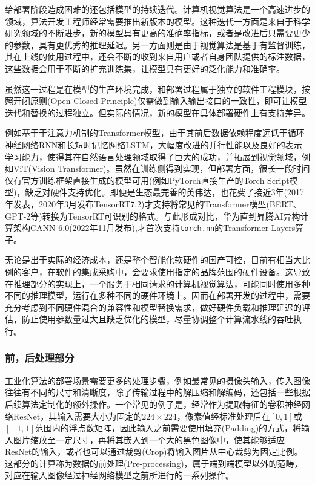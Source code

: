 \documentclass[master]{shtthesis}
\begin{document}
给部署阶段造成困难的还包括模型的持续迭代。计算机视觉算法是一个高速进步的领域，算法开发工程师经常需要推出新版本的模型。这种迭代一方面是来自于科学研究领域的不断进步，新的模型具有更高的准确率指标，或者是改进后只需要更少的参数，具有更优秀的推理延迟。另一方面则是由于视觉算法是基于有监督训练，其在上线的使用过程中，还会不断的收到来自用户或者自身团队提供的标注数据，这些数据会用于不断的扩充训练集，让模型具有更好的泛化能力和准确率。

虽然这一过程是在模型的生产环境完成，和部署过程属于独立的软件工程模块，按照开闭原则(Open-Closed Principle)仅需做到输入输出接口的一致性，即可让模型迭代和替换的过程独立。但实际的情况，新的模型在具体部署硬件上有支持差异。

例如基于于注意力机制的Transformer\cite{vaswani2017attention}模型，由于其前后数据依赖程度远低于循环神经网络RNN和长短时记忆网络LSTM，大幅度改进的并行性能以及良好的表示学习能力，使得其在自然语言处理领域取得了巨大的成功，并拓展到视觉领域，例如ViT(Vision Transformer)\cite{khan2022transformers}。虽然在训练侧得到实现，但部署方面，很长一段时间仅有官方训练框架直接生成的模型可用(例如PyTorch直接生产的Torch Script模型)，缺乏对硬件支持优化。即便是生态最完善的英伟达，也花费了接近3年(2017年发表，2020年3月发布TensorRT7.2)才支持将常见的Transformer模型(BERT、GPT-2等)转换为TensorRT\cite{tensorrt7}可识别的格式。与此形成对比，华为直到昇腾AI异构计算架构CANN 6.0(2022年11月发布)\cite{HuaweiCANN},才首次支持\verb|torch.nn|的Transformer Layers算子。

无论是出于实际的经济成本，还是整个智能化软硬件的国产可控，目前有相当大比例的客户，在软件的集成采购中，会要求使用指定的品牌范围的硬件设备。这导致在推理部分的实现上，一个服务于相同请求的计算机视觉算法，可能同时使用多种不同的推理模型，运行在多种不同的硬件环境上。因而在部署开发的过程中，需要充分考虑到不同硬件混合的兼容性和模型替换需求，做好硬件负载和推理延迟的评估，防止使用参数量过大且缺乏优化的模型，尽量协调整个计算流水线的吞吐执行。

\subsubsection{前，后处理部分}\label{前，后处理部分}
工业化算法的部署场景需要更多的处理步骤，例如最常见的摄像头输入，传入图像往往有不同的尺寸和清晰度，除了传输过程中的解压缩和解编码，还包括一些根据后续算法定制化的额外操作。一个常见的例子是，经常作为提取特征的卷积神经网络ResNet，其输入需要大小为固定的$224\times224$，像素值经标准处理后在$[0, 1]$或$[-1, 1]$范围内的浮点数矩阵，因此输入之前需要使用填充(Padding)的方式，将输入图片缩放至一定尺寸，再将其嵌入到一个大的黑色图像中，使其能够适应ResNet的输入，或者也可以通过裁剪(Crop)将输入图片从中心裁剪为固定比例。这部分的计算称为数据的前处理(Pre-processing)，属于端到端模型以外的范畴，对应在输入图像经过神经网络模型之前所进行的一系列操作。
\end{document}
